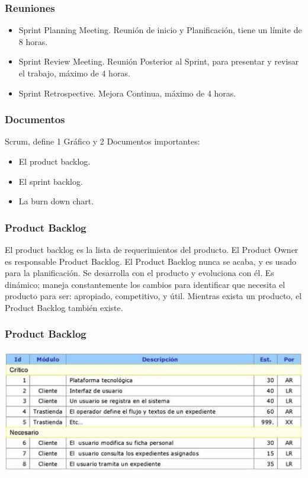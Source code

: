 \documentclass[12pt]{beamer}
\begin{document}
\begin{frame}
 \frametitle{Reuniones}
 \begin{itemize}
  \item<2-> Sprint Planning Meeting. Reunión de inicio y Planificación, tiene un límite de 8 horas.
  \item<3-> Sprint Review Meeting. Reunión Posterior al Sprint, para presentar y revisar el trabajo, máximo de 4 horas.
  \item<4-> Sprint Retrospective. Mejora Continua, máximo de 4 horas.
 \end{itemize}
\end{frame}


\begin{frame}
 \frametitle{Documentos}
 Scrum, define 1 Gráfico y 2 Documentos importantes:
 \begin{itemize}
  \item<2-> El product backlog.
  \item<3-> El sprint backlog.
  \item<4-> La burn down chart.
 \end{itemize}
\end{frame}


\begin{frame}
 \frametitle{Product Backlog}
 El product backlog es la lista de requerimientos del producto. El Product Owner es responsable Product Backlog. El Product Backlog nunca se acaba, y es usado para la planificación. Se desarrolla con el producto y evoluciona con él. Es dinámico; maneja constantemente los cambios para identificar que necesita el producto para ser: apropiado, competitivo, y útil. Mientras exista un producto, el Product Backlog también existe. 
\end{frame}


\begin{frame}
 \frametitle{Product Backlog}
 \includegraphics[scale=0.5]{img/product_backlog.png}
\end{frame}
\end{document}

